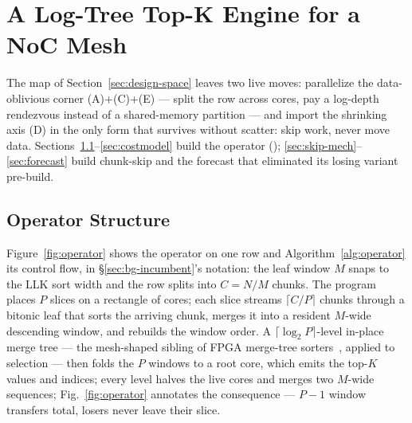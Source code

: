 \section{A Log-Tree Top-K Engine for a NoC Mesh}
\label{sec:system}

The map of Section~\ref{sec:design-space} leaves two live moves:
parallelize the data-oblivious corner (A)+(C)+(E) --- split the row
across cores, pay a log-depth rendezvous instead of a shared-memory
partition --- and import the shrinking axis (D) in the only form that
survives without scatter: skip work, never move data. Sections~\ref{sec:tree}--\ref{sec:costmodel} build the operator
(\topkop); \ref{sec:skip-mech}--\ref{sec:forecast} build chunk-skip and
the forecast that eliminated its losing variant pre-build.

\subsection{Operator Structure}
\label{sec:tree}

Figure~\ref{fig:operator} shows the operator on one row and
Algorithm~\ref{alg:operator} its control flow, in
\S\ref{sec:bg-incumbent}'s notation: the leaf window $M$ snaps to the
LLK sort width and the row splits into $C = N/M$ chunks. The program places $P$ slices on a rectangle of cores;
each slice streams $\lceil C/P \rceil$ chunks through a bitonic leaf that
sorts the arriving chunk, merges it into a resident $M$-wide descending
window, and rebuilds the window order. A $\lceil \log_2 P \rceil$-level
in-place merge tree --- the mesh-shaped sibling of FPGA merge-tree
sorters~\cite{samardzic2020bonsai}, applied to selection --- then folds
the $P$ windows to a root core, which emits the top-$K$ values and
indices; every level halves the live cores and merges two $M$-wide
sequences; Fig.~\ref{fig:operator} annotates the consequence ---
$P{-}1$ window transfers total, losers never leave their slice.

